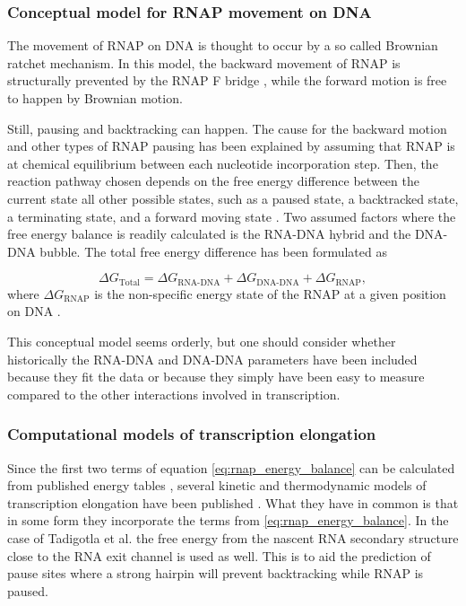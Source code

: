 %

\subsubsection{Conceptual model for RNAP movement on DNA}
The movement of RNAP on DNA is thought to occur by a so called Brownian ratchet
mechanism. In this model, the backward movement of RNAP is structurally
prevented by the RNAP F bridge \cite{bar-nahum_ratchet_2005}, while the forward
motion is free to happen by Brownian motion.

Still, pausing and backtracking can happen. The cause for the backward motion
and other types of RNAP pausing has been explained by assuming that RNAP is at
chemical equilibrium between each nucleotide incorporation step. Then, the
reaction pathway chosen depends on the free energy difference between the
current state all other possible states, such as a paused state, a backtracked
state, a terminating state, and a forward moving state
\cite{greive_thinking_2005}. Two assumed factors where the free energy balance
is readily calculated is the RNA-DNA hybrid and the DNA-DNA bubble. The total
free energy difference has been formulated as

\begin{equation}
	\Delta G_{\text{Total}} = \Delta G_{\text{RNA-DNA}} + \Delta
	G_{\text{DNA-DNA}} + \Delta G_{\text{RNAP}},
	\label{eq:rnap_energy_balance}
\end{equation}
where $\Delta G_{\text{RNAP}}$ is the non-specific energy state of the RNAP at
a given position on DNA \cite{greive_thinking_2005}.

This conceptual model seems orderly, but one should consider whether
historically the RNA-DNA and DNA-DNA parameters have been included because they
fit the data or because they simply have been easy to measure compared to the
other interactions involved in transcription.

\subsubsection{Computational models of transcription elongation}
Since the first two terms of equation \eqref{eq:rnap_energy_balance} can be
calculated from published energy tables \cite{wu_temperature_2002, 
santalucia_thermodynamics_2004}, several kinetic and thermodynamic models
of transcription elongation have been published
\cite{tadigotla_thermodynamic_2006-1} \cite{bai_sequence-dependent_2004}
\cite{guajardo_model_1997}. What they have in common is that in some form they
incorporate the terms from \eqref{eq:rnap_energy_balance}. In the case of
Tadigotla et al. \cite{tadigotla_thermodynamic_2006-1} the free energy from the
nascent RNA secondary structure close to the RNA exit channel is used as
well. This is to aid the prediction of pause sites where a strong hairpin will
prevent backtracking while RNAP is paused.

